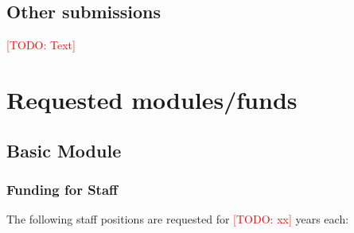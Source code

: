 \documentclass[american,firsttime]{dfgproposal}
\newcommand{\todo}[1]{\xspace{\textcolor{red}{[TODO: #1]}}\xspace}
\begin{document}
	\subsection{Other submissions}
	\todo{Text}
	
	
	\section{Requested modules/funds}
	
	\subsection{Basic Module}
	
	\subsubsection{Funding for Staff}
	\begin{funds}
		The following staff positions are requested for \todo{xx} years each:
		
	\end{funds}
	
	
\end{document}

